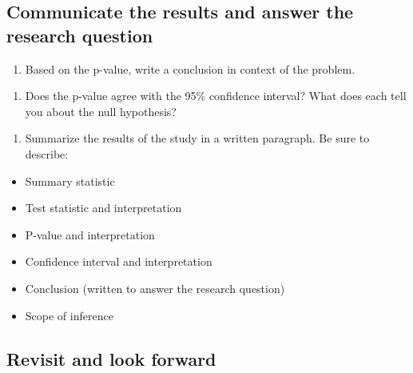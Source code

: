 \documentclass[
]{report}
\providecommand{\tightlist}{%
  \setlength{\itemsep}{0pt}\setlength{\parskip}{0pt}}
\begin{document}
\hypertarget{communicate-the-results-and-answer-the-research-question}{%
\subsection*{Communicate the results and answer the research question}\label{communicate-the-results-and-answer-the-research-question}}

\begin{enumerate}
\def\labelenumi{\arabic{enumi}.}
\setcounter{enumi}{16}
\tightlist
\item
  Based on the p-value, write a conclusion in context of the problem.
\end{enumerate}

\vspace{1in}

\begin{enumerate}
\def\labelenumi{\arabic{enumi}.}
\setcounter{enumi}{17}
\tightlist
\item
  Does the p-value agree with the 95\% confidence interval? What does each tell you about the null hypothesis?
\end{enumerate}

\vspace{1in}

\begin{enumerate}
\def\labelenumi{\arabic{enumi}.}
\setcounter{enumi}{18}
\tightlist
\item
  Summarize the results of the study in a written paragraph. Be sure to describe:
\end{enumerate}

\begin{itemize}
\item
  Summary statistic
\item
  Test statistic and interpretation
\item
  P-value and interpretation
\item
  Confidence interval and interpretation
\item
  Conclusion (written to answer the research question)
\item
  Scope of inference
\end{itemize}

\vspace{3in}

\newpage

\hypertarget{revisit-and-look-forward}{%
\subsection*{Revisit and look forward}\label{revisit-and-look-forward}}
\end{document}
